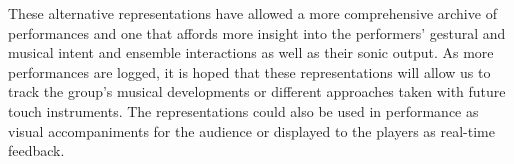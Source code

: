 \documentclass[graybox]{svmult}
\begin{document}
These alternative representations have allowed a more comprehensive
archive of performances and one that affords more insight into the
performers' gestural and musical intent and ensemble interactions as
well as their sonic output. As more performances are logged, it is
hoped that these representations will allow us to track the group's
musical developments or different approaches taken with future touch
instruments. The representations could also be used in performance as
visual accompaniments for the audience or displayed to the players as
real-time feedback.



\end{document}
